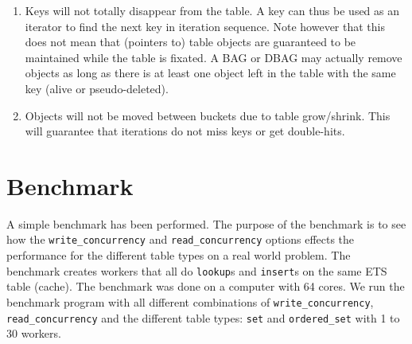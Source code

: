 \documentclass[aps,pre,preprint,nofootinbib]{revtex4}
\begin{document}
\begin{enumerate}
  \item Keys will not totally disappear from the table.
    A key can thus be used as an iterator to find the next key in iteration sequence.
    Note however that this does not mean that (pointers to) table objects are guaranteed to be maintained while the table is fixated.
    A BAG or DBAG may actually remove objects as long as there is at least one object left in the table with the same key (alive or pseudo-deleted).
    \item Objects will not be moved between buckets due to table grow/shrink.
      This will guarantee that iterations do not miss keys or get double-hits.
\end{enumerate}

\section{Benchmark} \label{sec:benchmark}

  A simple benchmark has been performed.
  The purpose of the benchmark is to see how the \verb|write_concurrency| and \verb|read_concurrency| options effects the performance for the different table types on a real world problem.
  The benchmark creates workers that all do \verb|lookup|s and \verb|insert|s on the same ETS table (cache).
  The benchmark was done on a computer with 64 cores.
  We run the benchmark program with all different combinations of \verb|write_concurrency|, \verb|read_concurrency| and the different table types: \verb|set| and \verb|ordered_set| with 1 to 30 workers.
  
\end{document}
